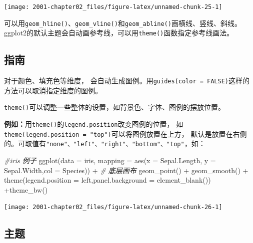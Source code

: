 \documentclass[
]{book}
\newenvironment{Shaded}{\begin{snugshade}}{\end{snugshade}}
\newcommand{\AttributeTok}[1]{\textcolor[rgb]{0.77,0.63,0.00}{#1}}
\newcommand{\CommentTok}[1]{\textcolor[rgb]{0.56,0.35,0.01}{\textit{#1}}}
\newcommand{\FunctionTok}[1]{\textcolor[rgb]{0.00,0.00,0.00}{#1}}
\newcommand{\NormalTok}[1]{#1}
\newcommand{\SpecialCharTok}[1]{\textcolor[rgb]{0.00,0.00,0.00}{#1}}
\newcommand{\StringTok}[1]{\textcolor[rgb]{0.31,0.60,0.02}{#1}}
\begin{document}
\begin{center}\texttt{[image: 2001-chapter02\_files/figure-latex/unnamed-chunk-25-1]} \end{center}

可以用\texttt{geom\_hline()}、\texttt{geom\_vline()}和\texttt{geom\_abline()}画横线、竖线、斜线。
ggplot2的默认主题会自动画参考线，可以用\texttt{theme()}函数指定参考线画法。

\hypertarget{ux6307ux5357}{%
\subsection{指南}\label{ux6307ux5357}}

对于颜色、填充色等维度，
会自动生成图例。用\texttt{guides(color\ =\ FALSE)}这样的方法可以取消指定维度的图例。

\texttt{theme()}可以调整一些整体的设置，如背景色、字体、图例的摆放位置。

\textbf{例如：}用\texttt{theme()}的\texttt{legend.position}改变图例的位置，
如\texttt{theme(legend.position\ =\ "top")}可以将图例放置在上方，
默认是放置在右侧的。可取值有\texttt{"none"、"left"、"right"、"bottom"、"top"}，如：

\begin{Shaded}
\begin{Highlighting}[]
\CommentTok{\#iris 例子}
\FunctionTok{ggplot}\NormalTok{(}\AttributeTok{data =}\NormalTok{ iris, }\AttributeTok{mapping =} \FunctionTok{aes}\NormalTok{(}\AttributeTok{x =}\NormalTok{ Sepal.Length, }\AttributeTok{y =}\NormalTok{ Sepal.Width,}\AttributeTok{col =}\NormalTok{ Species)) }\SpecialCharTok{+}  \CommentTok{\# 底层画布}
  \FunctionTok{geom\_point}\NormalTok{() }\SpecialCharTok{+}
  \FunctionTok{geom\_smooth}\NormalTok{() }\SpecialCharTok{+}
  \FunctionTok{theme}\NormalTok{(}\AttributeTok{legend.position =} \StringTok{\textquotesingle{}left\textquotesingle{}}\NormalTok{,}\AttributeTok{panel.background =} \FunctionTok{element\_blank}\NormalTok{()) }\SpecialCharTok{+}\FunctionTok{theme\_bw}\NormalTok{()}
\end{Highlighting}
\end{Shaded}

\begin{center}\texttt{[image: 2001-chapter02\_files/figure-latex/unnamed-chunk-26-1]} \end{center}

\hypertarget{ux4e3bux9898}{%
\subsection{主题}\label{ux4e3bux9898}}
\end{document}
